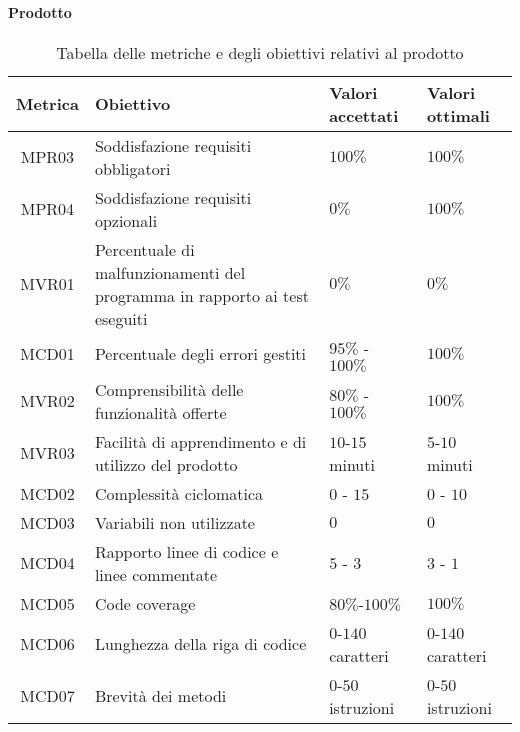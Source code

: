 \paragraph{Prodotto}
\begin{table}[H]
		\begin{center}
			\setlength{\aboverulesep}{0pt}
			\setlength{\belowrulesep}{0pt}
			\setlength{\extrarowheight}{.75ex}
			\begin{tabular}{ c C{6cm} C{3cm} C{3cm} }
				\textbf{Metrica} & \textbf{Obiettivo} & \textbf{Valori accettati} & \textbf{Valori ottimali}  \\
				\toprule
				MPR03 & Soddisfazione requisiti obbligatori & $100 \%$ & $100 \%$ \\
				MPR04 & Soddisfazione requisiti opzionali & $ 0 \%$ & $ 100\%$ \\
				MVR01 & Percentuale di malfunzionamenti del programma in rapporto ai test eseguiti & $ 0\%$  & $0\%$ \\
				MCD01 & Percentuale degli errori gestiti & $ 95\%$ - $100\% $ & $100\%$ \\
				MVR02 & Comprensibilità delle funzionalità offerte & $ 80\%$ - $100\% $ & $100\%$ \\
				MVR03 & Facilità di apprendimento e di utilizzo del prodotto & $10$-$15$ minuti & $5$-$10$ minuti \\
				MCD02 & Complessità ciclomatica & $0$ - $15$ & $0$ - $10$ \\
				MCD03 & Variabili non utilizzate & $0$ & $0$ \\
				MCD04 & Rapporto linee di codice e linee commentate & $5$ - $3$ & $3$ - $1$\\
				MCD05 & Code coverage & $80\%$-$100\%$ & $100\%$ \\
				MCD06 & Lunghezza della riga di codice & $0$-$140$ caratteri & $0$-$140$ caratteri \\
				MCD07 & Brevità dei metodi & $0$-$50$ istruzioni & $0$-$50$ istruzioni \\
				\bottomrule
			\end{tabular}
			\caption{Tabella delle metriche e degli obiettivi relativi al prodotto}
		\end{center}
	\end{table}